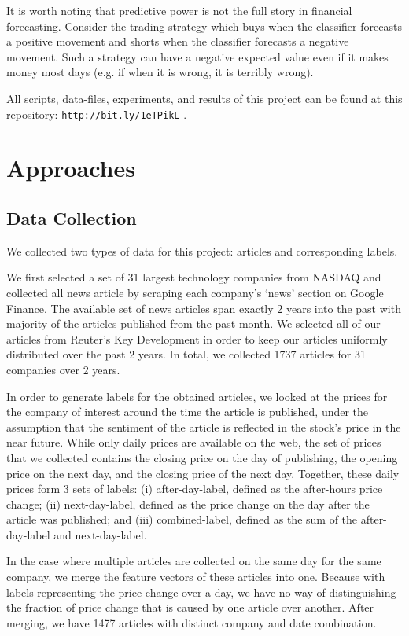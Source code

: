 \documentclass{article}
\begin{document}
It is worth noting that predictive power is not the full story in financial forecasting. Consider the trading strategy which buys when the classifier forecasts a positive movement and shorts when the classifier forecasts a negative movement. Such a strategy can have a negative expected value even if it makes money most days (e.g. if when it is wrong, it is terribly wrong).

All scripts, data-files, experiments, and results of this project can be found at this repository: \texttt{http://bit.ly/1eTPikL} . 

\section{Approaches}



\subsection{Data Collection}
We collected two types of data for this project: articles and corresponding labels. 

We first selected a set of 31 largest technology companies from NASDAQ and collected all news article by scraping each company's `news' section on Google Finance. The available set of news articles span exactly 2 years into the past with majority of the articles published from the past month. We selected all of our articles from Reuter's Key Development in order to keep our articles uniformly distributed over the past 2 years. In total, we collected 1737 articles for 31 companies over 2 years. 

In order to generate labels for the obtained articles, we looked at the prices for the company of interest around the time the article is published, under the assumption that the sentiment of the article is reflected in the stock's price in the near future. While only daily prices are available on the web, the set of prices that we collected contains the closing price on the day of publishing, the opening price on the next day, and the closing price of the next day. Together, these daily prices form 3 sets of labels: (i) after-day-label, defined as the after-hours price change; (ii) next-day-label, defined as the price change on the day after the article was published; and (iii) combined-label, defined as the sum of the after-day-label and next-day-label.

In the case where multiple articles are collected on the same day for the same company, we merge the feature vectors of these articles into one. Because with labels representing the price-change over a day, we have no way of distinguishing the fraction of price change that is caused by one article over another. After merging, we have 1477 articles with distinct company and date combination. 
\end{document}
